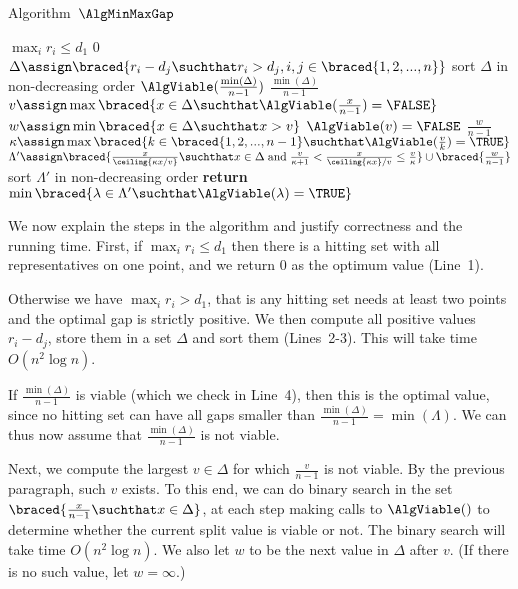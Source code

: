 \begin{algorithm}
  \caption{Algorithm~$\AlgMinMaxGap$}
  \label{alg:minmaxgap}
  \begin{algorithmic}[1]
	\State {\myIf} {$\max_i r_i\le d_1$} {\myThen} {\myReturn} $0$
	\State $\Delta \assign \braced{ r_i - d_j \suchthat r_i > d_j, i,j \in \braced{1,2,...,n}}$
	\State sort $\Delta$ in non-decreasing order
	\State {\myIf} {$\AlgViable(\frac{\min(\Delta)}{n-1})$} {\myThen} {\myReturn} $\frac{\min(\Delta)}{n-1}$
	\State $v \assign \max\braced{ x \in \Delta \suchthat \AlgViable(\frac{x}{n-1}) = \FALSE}$
	\State $w\assign \min \braced{ x \in \Delta \suchthat x > v }$
	\State {\myIf} {$\AlgViable(v) = \FALSE$} {\myThen} {\myReturn} $\frac{w}{n-1}$
	\State $\kappa \assign \max\braced{k \in \braced{1,2,...,n-1} \suchthat \AlgViable(\frac{v}{k}) = \TRUE}$
	\State $\Lambda'\assign \braced{ \frac{x}{ \ceiling{ \kappa x/v } }
						\suchthat x\in \Delta \;\textrm{and}\; \frac{v}{\kappa + 1} < \frac{x}{ \ceiling{ \kappa x}/v } \leq \frac{v}{\kappa}
						}\cup\braced{\frac{w}{n-1}}$		
	\State sort $\Lambda'$ in non-decreasing order
	\State \textbf{return} $\min \braced{ \lambda \in \Lambda' \suchthat \AlgViable(\lambda) = \TRUE}$
  \end{algorithmic}
\end{algorithm} 

\bigskip

We now explain the steps in the algorithm and justify correctness and the running time.
First, if $\max_i r_i\le d_1$ then there is a hitting set with all representatives on one point, 
and we return $0$ as the optimum value (Line~1).

Otherwise we have $\max_i r_i > d_1$, that is any hitting set needs at least two points and 
the optimal gap is strictly positive. 
We then compute all positive values $r_i - d_j$, store them in a set $\Delta$ and sort them (Lines~2-3).
This will take time $O(n^2\log n)$.

If $\frac{\min(\Delta)}{n-1}$ is viable (which we check in Line~4), 
then this is the optimal value, since no hitting set can have all
gaps smaller than $\frac{\min(\Delta)}{n-1} = \min(\Lambda)$. 
We can thus now assume that $\frac{\min(\Delta)}{n-1}$ is not viable.

Next, we compute the largest $v\in \Delta$ for which $\frac{v}{n-1}$ is not viable. By the
previous paragraph, such $v$ exists. 
To this end, we can do binary search in the set $\braced{\frac{x}{n-1} \suchthat x \in \Delta}$,
at each step making calls to $\AlgViable()$ to
determine whether the current split value is viable or not.
The binary search will take time $O(n^2\log n)$. 
We also let $w$ to be the next value in $\Delta$ after $v$. (If there is no such value, let $w = \infty$.)

